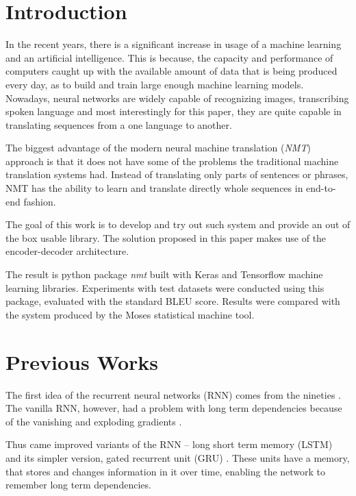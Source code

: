 \documentclass{ExcelAtFIT}
\affiliation{*%
  \href{mailto:xholcn01@stud.fit.vutbr.cz}{xholcn01@stud.fit.vutbr.cz},
  \textit{Faculty of Information Technology, Brno University of Technology}}
\begin{document}
\startdocument


\section{Introduction}
In the recent years, there is a significant increase in usage of a machine learning and an artificial intelligence. This is because, the capacity and performance of computers caught up with the available amount of data that is being produced every day, as to build and train large enough machine learning models. Nowadays, neural networks are widely capable of recognizing images, transcribing spoken language and most interestingly for this paper, they are quite capable in translating sequences from a one language to another.

The biggest advantage of the modern neural machine translation (\emph{NMT}) approach is that it does not have some of the problems the traditional machine translation systems had. Instead of translating only parts of sentences or phrases, NMT has the ability to learn and translate directly whole sequences in end-to-end fashion.

The goal of this work is to develop and try out such system and provide an out of the box usable library. The solution proposed in this paper makes use of the encoder-decoder architecture.

The result is python package \emph{nmt} built with Keras and Tensorflow machine learning libraries. Experiments with test datasets were conducted using this package, evaluated with the standard BLEU score. Results were compared with the system produced by the Moses \cite{Moses} statistical machine tool.


\section{Previous Works}
The first idea of the recurrent neural networks (RNN) comes from the nineties \cite{rnn}. The vanilla RNN, however, had a problem with long term dependencies because of the vanishing and exploding gradients \cite{gradientProblems}.

Thus came improved variants of the RNN -- long short term memory (LSTM) \cite{LSTM, forgetLSTM} and its simpler version, gated recurrent unit (GRU) \cite{GRU}. These units have a memory, that stores and changes information in it over time, enabling the network to remember long term dependencies.
\end{document}
